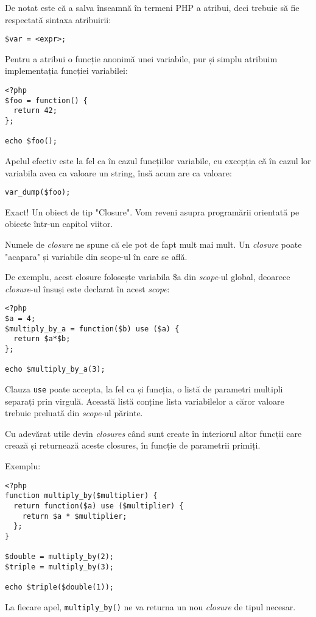 De notat este că a salva înseamnă în termeni PHP a atribui, deci
trebuie să fie respectată sintaxa atribuirii:
\begin{verbatim}
$var = <expr>;
\end{verbatim}
Pentru a atribui o funcție anonimă unei variabile, pur și simplu
atribuim implementația funcției variabilei:
\begin{lstlisting}
<?php
$foo = function() {
  return 42;
};

echo $foo();
\end{lstlisting}
Apelul efectiv este la fel ca în cazul funcțiilor variabile,
cu excepția că în cazul lor variabila avea ca valoare un string, însă
acum are ca valoare:
\begin{lstlisting}
var_dump($foo);
\end{lstlisting}
Exact! Un obiect de tip "Closure". Vom reveni asupra
programării orientată pe obiecte
într-un capitol viitor.

Numele de \textit{closure} ne spune că ele pot de fapt mult mai mult.
Un \textit{closure} poate "acapara" și variabile din scope-ul în care se află.

De exemplu, acest closure folosește variabila \$a din \textit{scope}-ul global,
deoarece \textit{closure}-ul însuși este declarat în acest \textit{scope}:
\begin{lstlisting}
<?php
$a = 4;
$multiply_by_a = function($b) use ($a) {
  return $a*$b;
};

echo $multiply_by_a(3);
\end{lstlisting}
Clauza \texttt{use} poate accepta,
la fel ca și funcția, o listă de parametri multipli
separați prin virgulă. Această listă conține lista variabilelor
a căror valoare trebuie preluată din \textit{scope}-ul părinte.

Cu adevărat utile devin \textit{closures} când sunt 
create în interiorul altor funcții care crează și
returnează aceste closures, în funcție de parametrii primiți.

Exemplu:
\begin{lstlisting}
<?php
function multiply_by($multiplier) {
  return function($a) use ($multiplier) {
	return $a * $multiplier;
  };
}

$double = multiply_by(2);
$triple = multiply_by(3);

echo $triple($double(1));
\end{lstlisting}
La fiecare apel, \texttt{multiply\_by()} ne va returna
un nou \textit{closure} de tipul necesar.

